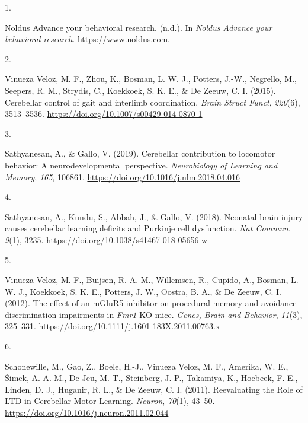 \documentclass[11pt,a4paper,]{awesome-cv}
\newlength{\cslhangindent}
\newlength{\csllabelwidth}
\newenvironment{CSLReferences}[3] %
 {%
  \setlength{\parindent}{0pt}
  \ifodd #1 \everypar{\setlength{\hangindent}{\cslhangindent}}\ignorespaces\fi
  \ifnum #2 > 0
  \setlength{\parskip}{#2\baselineskip}
  \fi
 }%
 {}
\newcommand{\CSLLeftMargin}[1]{\parbox[t]{\csllabelwidth}{#1}}
\newcommand{\CSLRightInline}[1]{\parbox[t]{\linewidth - \csllabelwidth}{#1}}
\begin{document}
\hypertarget{refs}{}
\begin{CSLReferences}{0}{0}
\leavevmode{}%
\CSLLeftMargin{1. }
\CSLRightInline{Noldus \textbar{} {Advance} your behavioral research.
(n.d.). In \emph{Noldus \textbar{} Advance your behavioral research}.
https://www.noldus.com.}

\leavevmode{}%
\CSLLeftMargin{2. }
\CSLRightInline{Vinueza Veloz, M. F., Zhou, K., Bosman, L. W. J.,
Potters, J.-W., Negrello, M., Seepers, R. M., Strydis, C., Koekkoek, S.
K. E., \& De Zeeuw, C. I. (2015). Cerebellar control of gait and
interlimb coordination. \emph{Brain Struct Funct}, \emph{220}(6),
3513--3536. \url{https://doi.org/10.1007/s00429-014-0870-1}}

\leavevmode{}%
\CSLLeftMargin{3. }
\CSLRightInline{Sathyanesan, A., \& Gallo, V. (2019). Cerebellar
contribution to locomotor behavior: {A} neurodevelopmental perspective.
\emph{Neurobiology of Learning and Memory}, \emph{165}, 106861.
\url{https://doi.org/10.1016/j.nlm.2018.04.016}}

\leavevmode{}%
\CSLLeftMargin{4. }
\CSLRightInline{Sathyanesan, A., Kundu, S., Abbah, J., \& Gallo, V.
(2018). Neonatal brain injury causes cerebellar learning deficits and
{Purkinje} cell dysfunction. \emph{Nat Commun}, \emph{9}(1), 3235.
\url{https://doi.org/10.1038/s41467-018-05656-w}}

\leavevmode{}%
\CSLLeftMargin{5. }
\CSLRightInline{Vinueza Veloz, M. F., Buijsen, R. A. M., Willemsen, R.,
Cupido, A., Bosman, L. W. J., Koekkoek, S. K. E., Potters, J. W.,
Oostra, B. A., \& De Zeeuw, C. I. (2012). The effect of an {mGluR5}
inhibitor on procedural memory and avoidance discrimination impairments
in {\emph{Fmr1}} {KO} mice. \emph{Genes, Brain and Behavior},
\emph{11}(3), 325--331.
\url{https://doi.org/10.1111/j.1601-183X.2011.00763.x}}

\leavevmode{}%
\CSLLeftMargin{6. }
\CSLRightInline{Schonewille, M., Gao, Z., Boele, H.-J., Vinueza Veloz,
M. F., Amerika, W. E., Šimek, A. A. M., De Jeu, M. T., Steinberg, J. P.,
Takamiya, K., Hoebeek, F. E., Linden, D. J., Huganir, R. L., \& De
Zeeuw, C. I. (2011). Reevaluating the {Role} of {LTD} in {Cerebellar
Motor Learning}. \emph{Neuron}, \emph{70}(1), 43--50.
\url{https://doi.org/10.1016/j.neuron.2011.02.044}}

\end{CSLReferences}
\end{document}
